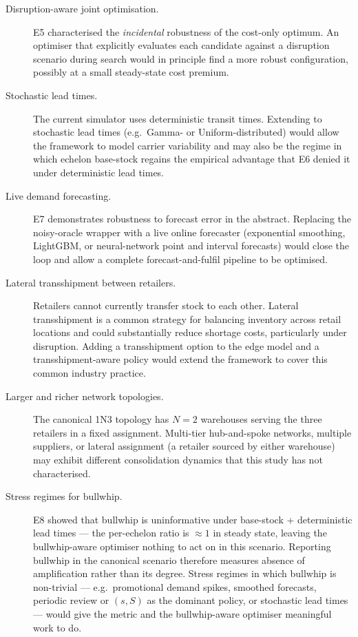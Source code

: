 \begin{description}
  \item[Disruption-aware joint optimisation.] E5 characterised the
        \emph{incidental} robustness of the cost-only optimum.  An
        optimiser that explicitly evaluates each candidate against a
        disruption scenario during search would in principle find a
        more robust configuration, possibly at a small steady-state
        cost premium.

  \item[Stochastic lead times.] The current simulator uses
        deterministic transit times.  Extending to stochastic lead
        times (e.g.\ Gamma- or Uniform-distributed) would allow the
        framework to model carrier variability and may also be the
        regime in which echelon base-stock regains the empirical
        advantage that E6 denied it under deterministic lead times.

  \item[Live demand forecasting.] E7 demonstrates robustness to
        forecast error in the abstract.  Replacing the noisy-oracle
        wrapper with a live online forecaster (exponential smoothing,
        LightGBM, or neural-network point and interval forecasts)
        would close the loop and allow a complete forecast-and-fulfil
        pipeline to be optimised.

  \item[Lateral transshipment between retailers.] Retailers cannot
        currently transfer stock to each other.  Lateral transshipment
        is a common strategy for balancing inventory across retail
        locations and could substantially reduce shortage costs,
        particularly under disruption.  Adding a transshipment option
        to the edge model and a transshipment-aware policy would
        extend the framework to cover this common industry practice.

  \item[Larger and richer network topologies.] The canonical 1N3
        topology has $N=2$ warehouses serving the three retailers in
        a fixed assignment.  Multi-tier hub-and-spoke networks,
        multiple suppliers, or lateral assignment (a retailer sourced
        by either warehouse) may exhibit different consolidation
        dynamics that this study has not characterised.

  \item[Stress regimes for bullwhip.] E8 showed that bullwhip is
        uninformative under base-stock + deterministic lead times —
        the per-echelon ratio is $\approx 1$ in steady state, leaving
        the bullwhip-aware optimiser nothing to act on in this
        scenario.  Reporting bullwhip in the canonical scenario
        therefore measures absence of amplification rather than its
        degree.  Stress regimes in which bullwhip is non-trivial —
        e.g.\ promotional demand spikes, smoothed forecasts, periodic
        review or $(s,S)$ as the dominant policy, or stochastic lead
        times — would give the metric and the bullwhip-aware
        optimiser meaningful work to do.


\end{description}
